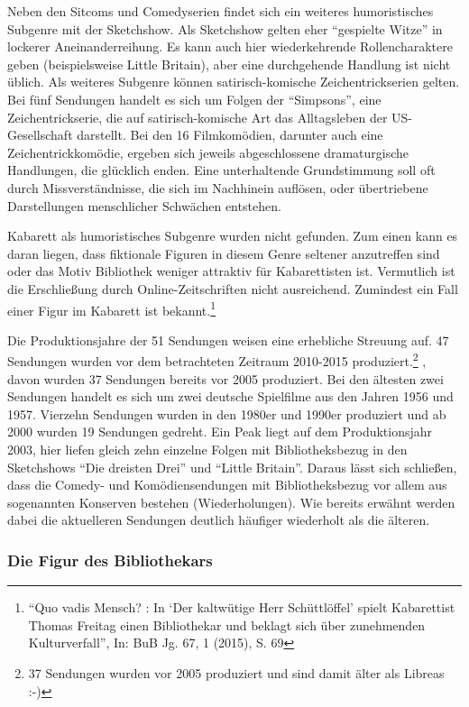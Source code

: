 Neben den Sitcoms und Comedyserien findet sich ein weiteres
humoristisches Subgenre mit der Sketchshow. Als Sketchshow gelten eher
\enquote{gespielte Witze} in lockerer Aneinanderreihung. Es kann auch
hier wiederkehrende Rollencharaktere geben (beispielsweise Little
Britain), aber eine durchgehende Handlung ist nicht üblich. Als weiteres
Subgenre können satirisch-komische Zeichentrickserien gelten. Bei fünf
Sendungen handelt es sich um Folgen der \enquote{Simpsons}, eine
Zeichentrickserie, die auf satirisch-komische Art das Alltagsleben der
US-Gesellschaft darstellt. Bei den 16 Filmkomödien, darunter auch eine
Zeichentrickkomödie, ergeben sich jeweils abgeschlossene dramaturgische
Handlungen, die glücklich enden. Eine unterhaltende Grundstimmung soll
oft durch Missverständnisse, die sich im Nachhinein auflösen, oder
übertriebene Darstellungen menschlicher Schwächen entstehen.

Kabarett als humoristisches Subgenre wurden nicht gefunden. Zum einen
kann es daran liegen, dass fiktionale Figuren in diesem Genre seltener
anzutreffen sind oder das Motiv Bibliothek weniger attraktiv für
Kabarettisten ist. Vermutlich ist die Erschließung durch
Online-Zeitschriften nicht ausreichend. Zumindest ein Fall einer Figur
im Kabarett ist bekannt.\footnote{\enquote{Quo vadis Mensch? : In
  \enquote{Der kaltwütige Herr Schüttlöffel} spielt Kabarettist Thomas
  Freitag einen Bibliothekar und beklagt sich über zunehmenden
  Kulturverfall}, In: BuB Jg. 67, 1 (2015), S. 69}

Die Produktionsjahre der 51 Sendungen weisen eine erhebliche Streuung
auf. 47 Sendungen wurden vor dem betrachteten Zeitraum 2010-2015
produziert.\footnote{37 Sendungen wurden vor 2005 produziert und sind
  damit älter als Libreas :-)} , davon wurden 37 Sendungen bereits vor
2005 produziert. Bei den ältesten zwei Sendungen handelt es sich um zwei
deutsche Spielfilme aus den Jahren 1956 und 1957. Vierzehn Sendungen
wurden in den 1980er und 1990er produziert und ab 2000 wurden 19
Sendungen gedreht. Ein Peak liegt auf dem Produktionsjahr 2003, hier
liefen gleich zehn einzelne Folgen mit Bibliotheksbezug in den
Sketchshows \enquote{Die dreisten Drei} und \enquote{Little Britain}.
Daraus lässt sich schließen, dass die Comedy- und Komödiensendungen mit
Bibliotheksbezug vor allem aus sogenannten Konserven bestehen
(Wiederholungen). Wie bereits erwähnt werden dabei die aktuelleren
Sendungen deutlich häufiger wiederholt als die älteren.

\subsubsection{Die Figur des
Bibliothekars}\label{die-figur-des-bibliothekars}

